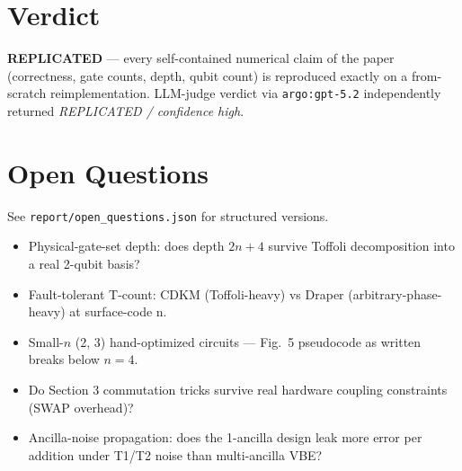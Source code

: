 \documentclass[11pt]{article}
\begin{document}
\section{Verdict}
\textbf{REPLICATED} — every self-contained numerical claim of the paper
(correctness, gate counts, depth, qubit count) is reproduced exactly on a
from-scratch reimplementation. LLM-judge verdict via \texttt{argo:gpt-5.2}
independently returned \emph{REPLICATED / confidence high}.

\section*{Open Questions}
See \texttt{report/open\_questions.json} for structured versions.

\begin{itemize}
  \item[Q1.] Physical-gate-set depth: does depth $2n{+}4$ survive Toffoli decomposition into a real 2-qubit basis?
  \item[Q2.] Fault-tolerant T-count: CDKM (Toffoli-heavy) vs Draper (arbitrary-phase-heavy) at surface-code n.
  \item[Q3.] Small-$n$ (2, 3) hand-optimized circuits — Fig.~5 pseudocode as written breaks below $n=4$.
  \item[Q4.] Do Section 3 commutation tricks survive real hardware coupling constraints (SWAP overhead)?
  \item[Q5.] Ancilla-noise propagation: does the 1-ancilla design leak more error per addition under T1/T2 noise than multi-ancilla VBE?
\end{itemize}
\end{document}

